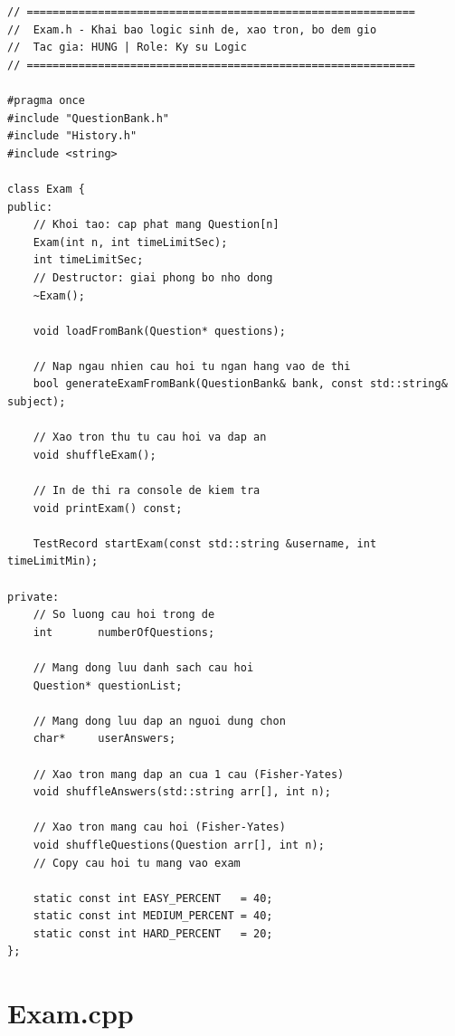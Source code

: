 \documentclass[11pt]{report}
\begin{document}
\begin{lstlisting}[caption={Exam.h -- Khai báo logic sinh đề, xáo trộn, bộ đếm giờ}, label={lst:full_exam_h}]
// ============================================================
//  Exam.h - Khai bao logic sinh de, xao tron, bo dem gio
//  Tac gia: HUNG | Role: Ky su Logic
// ============================================================

#pragma once
#include "QuestionBank.h"
#include "History.h"
#include <string>

class Exam {
public:
    // Khoi tao: cap phat mang Question[n]
    Exam(int n, int timeLimitSec);
    int timeLimitSec;
    // Destructor: giai phong bo nho dong
    ~Exam();

    void loadFromBank(Question* questions);

    // Nap ngau nhien cau hoi tu ngan hang vao de thi
    bool generateExamFromBank(QuestionBank& bank, const std::string& subject);

    // Xao tron thu tu cau hoi va dap an
    void shuffleExam();

    // In de thi ra console de kiem tra
    void printExam() const;

    TestRecord startExam(const std::string &username, int timeLimitMin);

private:
    // So luong cau hoi trong de
    int       numberOfQuestions;

    // Mang dong luu danh sach cau hoi
    Question* questionList;

    // Mang dong luu dap an nguoi dung chon
    char*     userAnswers;

    // Xao tron mang dap an cua 1 cau (Fisher-Yates)
    void shuffleAnswers(std::string arr[], int n);

    // Xao tron mang cau hoi (Fisher-Yates)
    void shuffleQuestions(Question arr[], int n);
    // Copy cau hoi tu mang vao exam

    static const int EASY_PERCENT   = 40;
    static const int MEDIUM_PERCENT = 40;
    static const int HARD_PERCENT   = 20;
};
\end{lstlisting}

\section{Exam.cpp}
\end{document}
